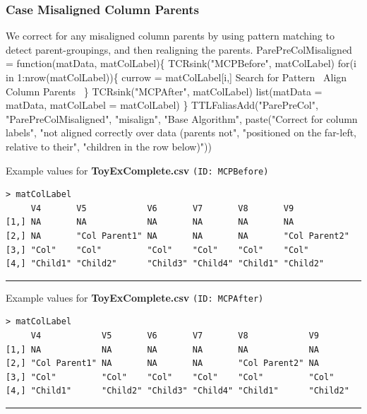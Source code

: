 \documentclass[a4paper]{article}
\begin{document}
\subsubsection{Case Misaligned Column Parents}
We correct for any misaligned column parents by using pattern matching
to detect parent-groupings, and then realigning the parents.
\nwenddocs{}\endmoddef
ParePreColMisaligned =
  function(matData, matColLabel)\{
    TCRsink("MCPBefore", matColLabel)
    for(i in 1:nrow(matColLabel))\{
      currow = matColLabel[i,]
      \LA{}Search for Pattern~{\nwtagstyle{}}\RA{}
      \LA{}Align Column Parents~{\nwtagstyle{}}\RA{}
    \}
    TCRsink("MCPAfter", matColLabel)
    list(matData = matData, matColLabel = matColLabel)
  \}
TTLFaliasAdd("ParePreCol", "ParePreColMisaligned", "misalign",
             "Base Algorithm", paste("Correct for column labels",
             "not aligned correctly over data (parents not",
             "positioned on the far-left, relative to their",
             "children in the row below)"))
\nwendcode{}\nwdocspar

Example values for \textbf{ToyExComplete.csv} \texttt{(ID: MCPBefore)}
\begin{verbatim}
> matColLabel
     V4       V5            V6       V7       V8       V9           
[1,] NA       NA            NA       NA       NA       NA           
[2,] NA       "Col Parent1" NA       NA       NA       "Col Parent2"
[3,] "Col"    "Col"         "Col"    "Col"    "Col"    "Col"        
[4,] "Child1" "Child2"      "Child3" "Child4" "Child1" "Child2"     
\end{verbatim}
\vspace{-1.5em}
\noindent\rule{0.25\textwidth}{0.4pt}
\vspace{0.5em}

Example values for \textbf{ToyExComplete.csv} \texttt{(ID: MCPAfter)}
\begin{verbatim}
> matColLabel
     V4            V5       V6       V7       V8            V9      
[1,] NA            NA       NA       NA       NA            NA      
[2,] "Col Parent1" NA       NA       NA       "Col Parent2" NA      
[3,] "Col"         "Col"    "Col"    "Col"    "Col"         "Col"   
[4,] "Child1"      "Child2" "Child3" "Child4" "Child1"      "Child2"
\end{verbatim}
\vspace{-1.5em}
\noindent\rule{0.25\textwidth}{0.4pt}
\vspace{0.5em}
\end{document}
